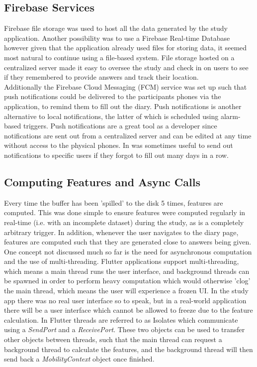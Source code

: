 \subsection{Firebase Services}
Firebase file storage was used to host all the data generated by the study application. Another possibility was to use a Firebase Real-time Database however given that the application already used files for storing data, it seemed most natural to continue using a file-based system. File storage hosted on a centralized server made it easy to oversee the study and check in on users to see if they remembered to provide answers and track their location. \\

Additionally the Firebase Cloud Messaging (FCM) service was set up such that push notifications could be delivered to the participants phones via the application, to remind them to fill out the diary. Push notifications is another alternative to local notifications, the latter of which is scheduled using alarm-based triggers. Push notifications are a great tool as a developer since notifications are sent out from a centralized server and can be edited at any time without access to the physical phones. In was sometimes useful to send out notifications to specific users if they forgot to fill out many days in a row.

\subsection{Computing Features and Async Calls }
Every time the buffer has been 'spilled' to the disk 5 times, features are computed. This was done simple to ensure features were computed regularly in real-time (i.e. with an incomplete dataset) during the study, as is a completely arbitrary trigger. In addition, whenever the user navigates to the diary page, features are computed such that they are generated close to answers being given. One concept not discussed much so far is the need for asynchronous computation and the use of multi-threading. Flutter applications support multi-threading, which means a main thread runs the user interface, and background threads can be spawned in order to perform heavy computation which would otherwise 'clog' the main thread, which means the user will experience a frozen UI. In the study app there was no real user interface so to speak, but in a real-world application there will be a user interface which cannot be allowed to freeze due to the feature calculation. In Flutter threads are referred to as Isolates which communicate using a \textit{SendPort} and a \textit{ReceivePort}. These two objects can be used to transfer other objects between threads, such that the main thread can request a background thread to calculate the features, and the background thread will then send back a \textit{MobilityContext} object once finished. 

